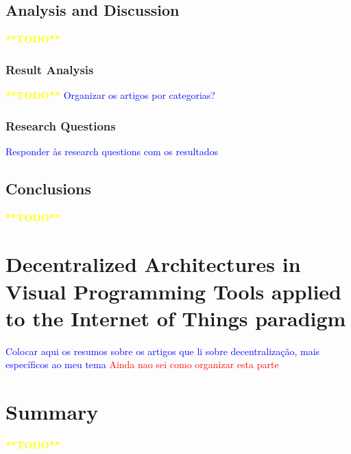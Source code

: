 \subsection{Analysis and Discussion}

\textcolor{yellow}{\textbf{**TODO**}}

\subsubsection{Result Analysis}

\textcolor{yellow}{\textbf{**TODO**}}
\textcolor{blue}{Organizar os artigos por categorias?}

\subsubsection{Research Questions}

\textcolor{blue}{Responder às research questions com os resultados}

\subsection{Conclusions}

\textcolor{yellow}{\textbf{**TODO**}}

\section{Decentralized Architectures in Visual Programming Tools applied to the Internet of Things paradigm}

\textcolor{blue}{Colocar aqui os resumos sobre os artigos que li sobre decentralização, mais específicos ao meu tema}
\textcolor{red}{Ainda nao sei como organizar esta parte}

\section{Summary}

\textcolor{yellow}{\textbf{**TODO**}}

